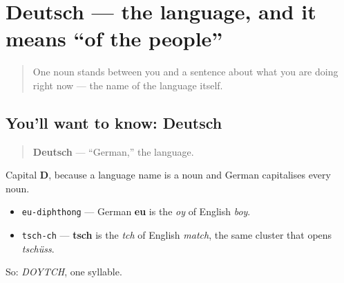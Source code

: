 \section[Deutsch]{Deutsch — the language, and it means \textquotedblleft{}of the people\textquotedblright{}}

\label{lesson:GE-C05-deutsch}



\begin{quote}
One noun stands between you and a sentence about what you are doing right now — the name of the language itself.
\end{quote}

\subsection*{You'll want to know: Deutsch}
\begin{quote}
\textbf{Deutsch} — \textquotedblleft{}German,\textquotedblright{} the language.
\end{quote}

Capital \textbf{D}, because a language name is a noun and German capitalises every noun.

\begin{sounds}
\begin{itemize}
\raggedright
  \item \texttt{eu-diphthong} — German \textbf{eu} is the \emph{oy} of English \emph{boy}.
  \item \texttt{tsch-ch} — \textbf{tsch} is the \emph{tch} of English \emph{match}, the same cluster that opens \emph{tschüss}.
\end{itemize}

So: \emph{DOYTCH}, one syllable.
\end{sounds}

